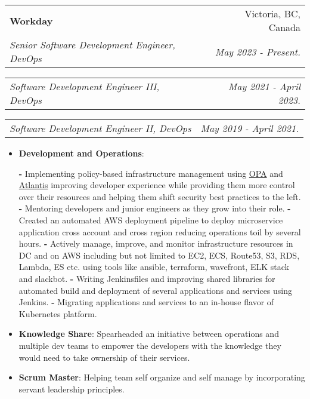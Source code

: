 \documentclass[letterpaper,10.5pt]{article}
\makeatletter
\newcommand{\resumeItem}[2]{
\item\small{
\textbf{#1}{: #2 \vspace{-2pt}}
}
}
\newcommand{\resumeSubheading}[4]{
\vspace{-1pt}\item
\begin{tabular*}{0.97\textwidth}[t]{l@{\extracolsep{\fill}}r}
    \textbf{#1}       & #2                 \\
    \textit{\small#3} & \textit{\small #4} \\
\end{tabular*}\vspace{-3pt}
}
\newcommand{\resumeSubSubheading}[2]{
    \vspace{3pt}
    \begin{tabular*}{0.97\textwidth}{l@{\extracolsep{\fill}}r}
      \textit{\small#1} & \textit{\small #2} \\
    \end{tabular*}\vspace{-5pt}
}
\newcommand{\resumeItemListStart}{\begin{itemize}}
\newcommand{\resumeItemListEnd}{\end{itemize}\vspace{-5pt}}
\makeatother
\begin{document}
\resumeSubheading
{Workday}{Victoria, BC, Canada}
{Senior Software Development Engineer, DevOps}{May 2023 - Present.}
\resumeSubSubheading
{Software Development Engineer III, DevOps}{May 2021 - April 2023.}
\resumeSubSubheading
{Software Development Engineer II, DevOps}{May 2019 - April 2021.}
\resumeItemListStart
\resumeItem{Development and Operations}{}
\newline
{\textbf{-} Implementing policy-based infrastructure management using 
\href{https://www.openpolicyagent.org/}{OPA} and \href{https://www.runatlantis.io/}{Atlantis} 
improving developer experience while providing them more control over their resources and helping them shift 
security best practices to the left.}
\newline
{\textbf{-} Mentoring developers and junior engineers as they grow into their role.}
\newline
{\textbf{-} Created an automated AWS deployment pipeline to deploy microservice application cross account and cross region
reducing operations toil by several hours.}
\newline
{\textbf{-} Actively manage, improve, and monitor infrastructure resources in DC and on AWS including but not limited to
EC2, ECS, Route53, S3, RDS, Lambda, ES etc. using tools like ansible, terraform, wavefront, ELK stack and slackbot.}
\newline
{\textbf{-} Writing Jenkinsfiles and improving shared libraries for automated build and deployment of several applications and services using Jenkins.}
\newline
{\textbf{-} Migrating applications and services to an in-house flavor of Kubernetes platform.}
\resumeItem{Knowledge Share}{Spearheaded an initiative between operations and multiple dev teams to empower the developers with the knowledge
they would need to take ownership of their services.}
\resumeItem{Scrum Master}{Helping team self organize and self manage by incorporating servant leadership principles.}
\resumeItemListEnd
\end{document}
